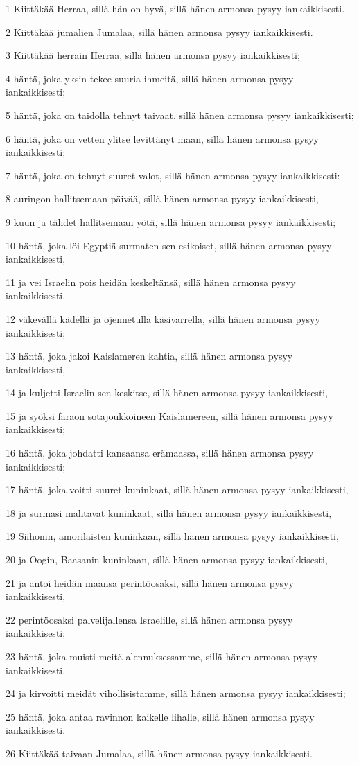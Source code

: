 \par 1 Kiittäkää Herraa, sillä hän on hyvä, sillä hänen armonsa pysyy iankaikkisesti.
\par 2 Kiittäkää jumalien Jumalaa, sillä hänen armonsa pysyy iankaikkisesti.
\par 3 Kiittäkää herrain Herraa, sillä hänen armonsa pysyy iankaikkisesti;
\par 4 häntä, joka yksin tekee suuria ihmeitä, sillä hänen armonsa pysyy iankaikkisesti;
\par 5 häntä, joka on taidolla tehnyt taivaat, sillä hänen armonsa pysyy iankaikkisesti;
\par 6 häntä, joka on vetten ylitse levittänyt maan, sillä hänen armonsa pysyy iankaikkisesti;
\par 7 häntä, joka on tehnyt suuret valot, sillä hänen armonsa pysyy iankaikkisesti:
\par 8 auringon hallitsemaan päivää, sillä hänen armonsa pysyy iankaikkisesti,
\par 9 kuun ja tähdet hallitsemaan yötä, sillä hänen armonsa pysyy iankaikkisesti;
\par 10 häntä, joka löi Egyptiä surmaten sen esikoiset, sillä hänen armonsa pysyy iankaikkisesti,
\par 11 ja vei Israelin pois heidän keskeltänsä, sillä hänen armonsa pysyy iankaikkisesti,
\par 12 väkevällä kädellä ja ojennetulla käsivarrella, sillä hänen armonsa pysyy iankaikkisesti;
\par 13 häntä, joka jakoi Kaislameren kahtia, sillä hänen armonsa pysyy iankaikkisesti,
\par 14 ja kuljetti Israelin sen keskitse, sillä hänen armonsa pysyy iankaikkisesti,
\par 15 ja syöksi faraon sotajoukkoineen Kaislamereen, sillä hänen armonsa pysyy iankaikkisesti;
\par 16 häntä, joka johdatti kansaansa erämaassa, sillä hänen armonsa pysyy iankaikkisesti;
\par 17 häntä, joka voitti suuret kuninkaat, sillä hänen armonsa pysyy iankaikkisesti,
\par 18 ja surmasi mahtavat kuninkaat, sillä hänen armonsa pysyy iankaikkisesti,
\par 19 Siihonin, amorilaisten kuninkaan, sillä hänen armonsa pysyy iankaikkisesti,
\par 20 ja Oogin, Baasanin kuninkaan, sillä hänen armonsa pysyy iankaikkisesti,
\par 21 ja antoi heidän maansa perintöosaksi, sillä hänen armonsa pysyy iankaikkisesti,
\par 22 perintöosaksi palvelijallensa Israelille, sillä hänen armonsa pysyy iankaikkisesti;
\par 23 häntä, joka muisti meitä alennuksessamme, sillä hänen armonsa pysyy iankaikkisesti,
\par 24 ja kirvoitti meidät vihollisistamme, sillä hänen armonsa pysyy iankaikkisesti;
\par 25 häntä, joka antaa ravinnon kaikelle lihalle, sillä hänen armonsa pysyy iankaikkisesti.
\par 26 Kiittäkää taivaan Jumalaa, sillä hänen armonsa pysyy iankaikkisesti.

